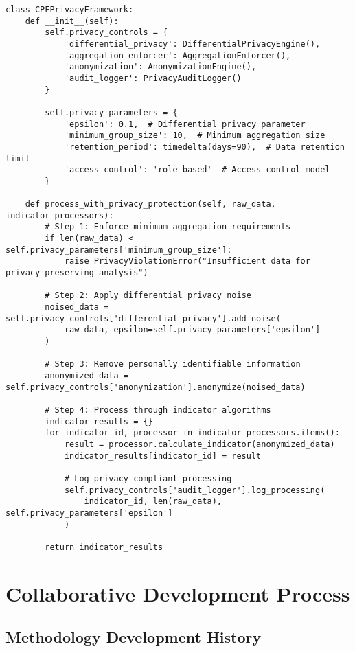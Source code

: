 \documentclass[11pt, onecolumn]{article}
\begin{document}
\begin{lstlisting}
class CPFPrivacyFramework:
    def __init__(self):
        self.privacy_controls = {
            'differential_privacy': DifferentialPrivacyEngine(),
            'aggregation_enforcer': AggregationEnforcer(),
            'anonymization': AnonymizationEngine(),
            'audit_logger': PrivacyAuditLogger()
        }
        
        self.privacy_parameters = {
            'epsilon': 0.1,  # Differential privacy parameter
            'minimum_group_size': 10,  # Minimum aggregation size
            'retention_period': timedelta(days=90),  # Data retention limit
            'access_control': 'role_based'  # Access control model
        }
        
    def process_with_privacy_protection(self, raw_data, indicator_processors):
        # Step 1: Enforce minimum aggregation requirements
        if len(raw_data) < self.privacy_parameters['minimum_group_size']:
            raise PrivacyViolationError("Insufficient data for privacy-preserving analysis")
        
        # Step 2: Apply differential privacy noise
        noised_data = self.privacy_controls['differential_privacy'].add_noise(
            raw_data, epsilon=self.privacy_parameters['epsilon']
        )
        
        # Step 3: Remove personally identifiable information
        anonymized_data = self.privacy_controls['anonymization'].anonymize(noised_data)
        
        # Step 4: Process through indicator algorithms
        indicator_results = {}
        for indicator_id, processor in indicator_processors.items():
            result = processor.calculate_indicator(anonymized_data)
            indicator_results[indicator_id] = result
            
            # Log privacy-compliant processing
            self.privacy_controls['audit_logger'].log_processing(
                indicator_id, len(raw_data), self.privacy_parameters['epsilon']
            )
        
        return indicator_results
\end{lstlisting}

\section{Collaborative Development Process}

\subsection{Methodology Development History}
\end{document}
